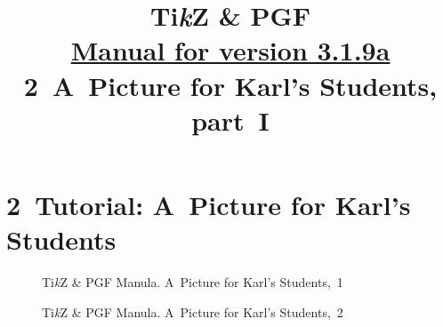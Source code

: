 \documentclass[a4paper,11pt]{article}
\title{Ti\textit{k}Z \& PGF \\
  \href{http://piotrkosoft.net/pub/mirrors/CTAN/graphics/pgf/base/doc/pgfmanual.pdf}{Manual for version 3.1.9a} \\
  2~A~Picture for Karl's Students, part~I}
\author{}
\begin{document}





\maketitle %










\newpage

\section{2~Tutorial: A~Picture for Karl's Students}

\vspace{2em}







\vspace{2em}





\begin{figure}[ht]

  \centering

  \begin{tikzpicture}




  \end{tikzpicture}

  \caption{Ti\textit{k}Z \& PGF Manula. A~Picture for Karl's Students,~1}

\end{figure}





\begin{figure}[ht]

  \centering


  \caption{Ti\textit{k}Z \& PGF Manula. A~Picture for Karl's Students,~2}

\end{figure}
\end{document}
